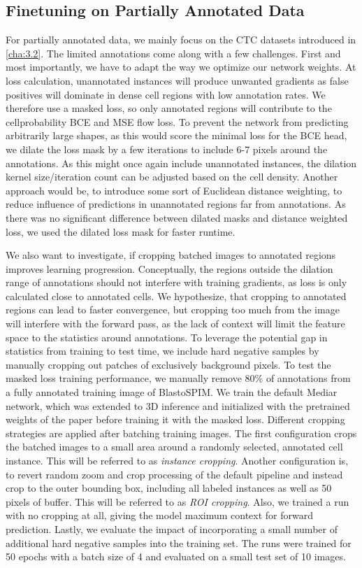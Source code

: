 \subsection{Finetuning on Partially Annotated Data}

For partially annotated data, we mainly focus on the CTC datasets introduced in \ref{cha:3.2}. The limited annotations come along with a few challenges. First and most importantly, we have to adapt the way we optimize our network weights. At loss calculation, unannotated instances will produce unwanted gradients as false positives will dominate in dense cell regions with low annotation rates. We therefore use a masked loss, so only annotated regions will contribute to the cellprobability BCE and MSE flow loss. To prevent the network from predicting arbitrarily large shapes, as this would score the minimal loss for the BCE head, we dilate the loss mask by a few iterations to include 6-7 pixels around the annotations. As this might once again include unannotated instances, the dilation kernel size/iteration count can be adjusted based on the cell density. Another approach would be, to introduce some sort of Euclidean distance weighting, to reduce influence of predictions in unannotated regions far from annotations. As there was no significant difference between dilated masks and distance weighted loss, we used the dilated loss mask for faster runtime.

We also want to investigate, if cropping batched images to annotated regions improves learning progression. Conceptually, the regions outside the dilation range of annotations should not interfere with training gradients, as loss is only calculated close to annotated cells. We hypothesize, that cropping to annotated regions can lead to faster convergence, but cropping too much from the image will interfere with the forward pass, as the lack of context will limit the feature space to the statistics around annotations. To leverage the potential gap in statistics from training to test time, we include hard negative samples by manually cropping out patches of exclusively background pixels.
To test the masked loss training performance, we manually remove 80\% of annotations from a fully annotated training image of BlastoSPIM. We train the default Mediar network, which was extended to 3D inference and initialized with the pretrained weights of the paper before training it with the masked loss. Different cropping strategies are applied after batching training images. The first configuration crops the batched images to a small area around a randomly selected, annotated cell instance. This will be referred to as \textit{instance cropping}. Another configuration is, to revert random zoom and crop processing of the default pipeline and instead crop to the outer bounding box, including all labeled instances as well as 50 pixels of buffer. This will be referred to as \textit{ROI cropping}. Also, we trained a run with no cropping at all, giving the model maximum context for forward prediction. Lastly, we evaluate the impact of incorporating a small number of additional hard negative samples into the training set. The runs were trained for 50 epochs with a batch size of 4 and evaluated on a small test set of 10 images. 

